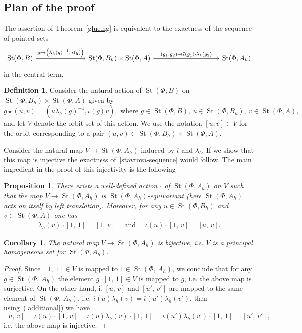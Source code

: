 \documentclass[oneside, 11pt]{amsart}
\numberwithin{equation}{section}
\newtheorem{proposition}[lemma]{Proposition}
\newtheorem{corollary}[lemma]{Corollary}
\newcommand{\St}{\mathop{\mathrm{St}}\nolimits}
\theoremstyle{definition}
\newtheorem{definition}[lemma]{Definition} \Crefname{definition}{Definition}{Definitions}
\theoremstyle{definition}
\theoremstyle{remark}
\begin{document}
\subsection{Plan of the proof}
\label{plan}

The assertion of Theorem~\ref{glueing} is equivalent to the exactness of the sequence of pointed sets 
\begin{equation}\label{stavrova-sequence} \begin{tikzcd} \St(\Phi, B) \ar{rrr}{g \mapsto \big(\lambda_h(g)^{-1},\, \iota(g)\big)} & &  & \St(\Phi, B_h) \times \St(\Phi, A) \ar{rrrr}{(g_1,g_2) \mapsto \overline{\iota}(g_1)\cdot\lambda_{h}(g_2)} & & & & \St(\Phi, A_{h}) \end{tikzcd} \end{equation}
in the central term. 
\begin{definition}
Consider the natural action of $\St(\Phi, B)$ on $\St(\Phi, B_h) \times \St(\Phi, A)$ given by
\[g \star (u, v) = (u \lambda_h(g)^{-1}, \iota(g) v),\text{ where }g \in \St(\Phi, B),\ u \in \St(\Phi, B_h),\ v \in \St(\Phi, A),\]
and let $V$ denote the orbit set of this action. We use the notation $[u, v]\in V$ for the orbit corresponding to a pair $(u, v) \in \St(\Phi, B_h) \times \St(\Phi, A)$.
\end{definition}

Consider the natural map $V \to \St(\Phi, A_h)$ induced by $\overline{\iota}$ and $\lambda_h$. If we show that this map is injective the exactness of~\eqref{stavrova-sequence} would follow. The main ingredient in the proof of this injectivity is the following

\begin{proposition}
\label{action}
There exists a well-defined action $\cdot$ of $\St(\Phi, A_{h})$ on $V$ such that the map $V \to \St(\Phi, A_{h})$ is $\St(\Phi, A_{h})$-equivariant (here $\St(\Phi, A_{h})$ acts on itself by left translation). Moreover, for any $u\in\St(\Phi, B_h)$ and $v\in\St(\Phi, A)$ one has 
\begin{align}
\label{additional}
\lambda_{h}(v)\cdot[1,\,1]=[1,\,v]\quad\text{ and }\quad\overline\iota(u)\cdot[1,\,v]=[u,\,v].
\end{align}
\end{proposition}
\begin{corollary}
\label{corollary-in-the-end}
The natural map $V\to \St(\Phi, A_{h})$ is bijective, i.e. $V$ is a principal homogeneous set for $\St(\Phi, A_{h})$.
\end{corollary}
\begin{proof}
Since $[1,\,1]\in V$ is mapped to $1\in\St(\Phi,\,A_{h})$, we conclude that for any $g\in\St(\Phi,\,A_{h})$ the element $g\cdot[1,\,1]\in V$ is mapped to $g$, i.e. the above map is surjective. On the other hand, if $[u,\,v]$ and $[u',\,v']$ are mapped to the same element of $\St(\Phi,\,A_{h})$, i.e. $\overline\iota(u)\lambda_{h}(v)=\overline\iota(u')\lambda_{h}(v')$, then using~(\ref{additional}) we have
$$
[u,\,v]=\overline\iota(u)\cdot[1,\,v]=\overline\iota(u)\lambda_{h}(v)\cdot[1,\,1]=\overline\iota(u')\lambda_{h}(v')\cdot[1,\,1]=[u',\,v'],
$$
i.e. the above map is injective.
\end{proof}
\end{document}
